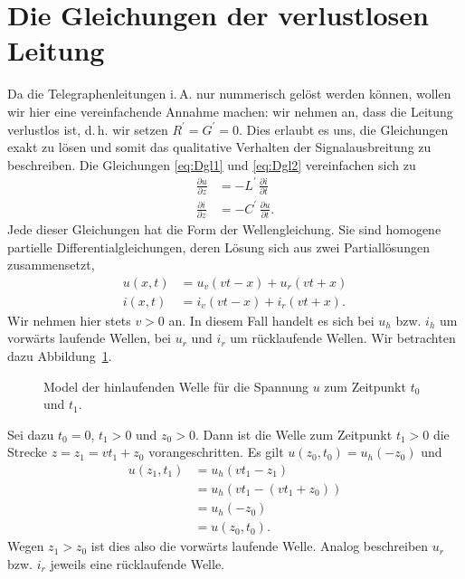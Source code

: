 \documentclass[paper=a4, parskip=half-, ngerman, fontsize=11pt]{scrreprt}
\begin{document}
\section{Die Gleichungen der verlustlosen Leitung}
\label{VerlustlosesModel}
Da die Telegraphenleitungen i.\,A. nur nummerisch gelöst werden können, wollen wir hier eine vereinfachende Annahme
machen: wir nehmen an, dass die Leitung verlustlos ist, d.\,h. wir setzen \mbox{$R^{\prime} = G^{\prime} = 0$}. Dies
erlaubt es uns, die Gleichungen exakt zu lösen und somit das qualitative Verhalten der Signalausbreitung zu
beschreiben. Die Gleichungen \eqref{eq:Dgl1} und \eqref{eq:Dgl2} vereinfachen sich zu
\begin{align}
    \frac{\partial u}{\partial z} &= - L^{\prime} \, \frac{\partial i}{\partial t} \label{eq:Dgl7} \\[1ex]
    \frac{\partial i}{\partial z} &= - C^{\prime} \, \frac{\partial u}{\partial t} \label{eq:Dgl8} .
\end{align}
Jede dieser Gleichungen hat die Form der Wellengleichung. Sie sind homogene partielle Differentialgleichungen, deren
Lösung sich aus zwei Partiallösungen zusammensetzt,
\begin{align}
u(x, t) &= u_{v}(v t - x) + u_{r}(v t + x) \label{eq:AllgEq1} \\[1ex]
i(x, t) &= i_{v}(v t - x) + i_{r}(v t + x) \label{eq:AllgEq2}.
\end{align}
Wir nehmen hier stets $v > 0$ an. In diesem Fall handelt es sich bei $u_{h}$ bzw. $i_{h}$ um vorwärts laufende Wellen,
bei $u_{r}$ und $i_{r}$ um rücklaufende Wellen. Wir betrachten dazu Abbildung~\ref{VorwaertsWelle}.
\begin{figure}[!htbp]
    \begin{center}
        
        \caption{Model der hinlaufenden Welle für die Spannung $u$ zum Zeitpunkt $t_{0}$ und $t_{1}$.}
        \label{VorwaertsWelle}
    \end{center}
\end{figure}
Sei dazu $t_{0} = 0$, $t_{1} > 0$ und $z_{0} > 0$. Dann ist die Welle zum Zeitpunkt $t_{1} > 0$ die Strecke
$z = z_{1} = v t_{1} + z_{0}$ vorangeschritten. Es gilt $u(z_{0}, t_{0}) = u_{h}(-z_{0})$ und
\begin{align*}
    u(z_{1}, t_{1}) &= u_{h}(v t_{1} - z_{1}) \\
                    &= u_{h}(v t_{1} - (v t_{1} + z_{0})) \\
                    &= u_{h}(- z_{0}) \\
                    &= u(z_{0}, t_{0}).
\end{align*}
Wegen $z_{1} > z_{0}$ ist dies also die vorwärts laufende Welle. Analog beschreiben $u_{r}$ bzw. $i_{r}$ jeweils eine
rücklaufende Welle.
\end{document}
